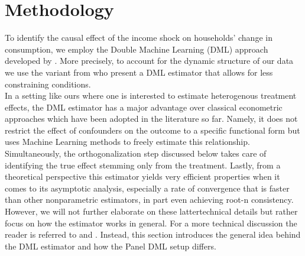 \newpage
\section{Methodology} \label{sec:methodology}
To identify the causal effect of the income shock on households' change in consumption, we employ the Double Machine Learning (DML) approach developed by \cite{DML2017}. More precisely, to account for the dynamic structure of our data we use the variant from \cite{PanelDML} who present a DML estimator that allows for less constraining conditions. \\ 
In a setting like ours where one is interested to estimate heterogenous treatment effects, the DML estimator has a major advantage over classical econometric approaches which have been adopted in the literature so far. Namely, it does not restrict the effect of confounders on the outcome to a specific functional form but uses Machine Learning methods to freely estimate this relationship. Simultaneously, the orthogonalization step discussed below takes care of identifying the true effect stemming only from the treatment. Lastly, from a theoretical perspective this estimator yields very efficient properties when it comes to its asymptotic analysis, especially a rate of convergence that is faster than other nonparametric estimators, in part even achieving root-n consistency. However, we will not further elaborate on these lattertechnical details but rather focus on how the estimator works in general. For a more technical discussion the reader is referred to \cite{DML2017} and \cite{PanelDML}. Instead, this section introduces the general idea behind the DML estimator and how the Panel DML setup differs. 

